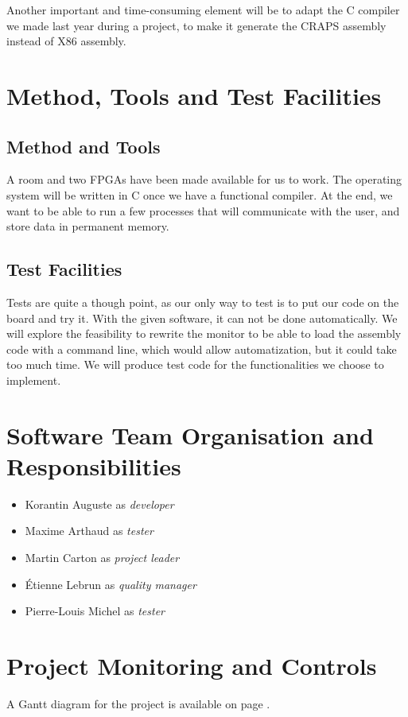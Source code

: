 \documentclass{article}
\begin{document}
    Another important and time-consuming element will be to adapt the C compiler
    we made last year during a project, to make it generate the CRAPS assembly instead
    of X86 assembly.

  \section{Method, Tools and Test Facilities}
    \subsection{Method and Tools}
    A room and two FPGAs have been made available for us to work.
    The operating system will be written in C once we have a functional
    compiler.
    At the end, we want to be able to run a few processes that will communicate
    with the user, and store data in permanent memory.

     \subsection{Test Facilities}
    Tests are quite a though point, as our only way to test is to put
    our code on the board and try it. With the given software, it can not be
    done automatically.
    We will explore the feasibility to rewrite the monitor to be able to load
    the assembly code with a command line, which would allow automatization, but
    it could take too much time.
    We will produce test code for the functionalities we choose to implement.

  \section{Software Team Organisation and Responsibilities}
    \begin{itemize}
      \item Korantin Auguste as \textit{developer}
      \item Maxime Arthaud as \textit{tester}
      \item Martin Carton as \textit{project leader}
      \item Étienne Lebrun as \textit{quality manager}
      \item Pierre-Louis Michel as \textit{tester}
    \end{itemize}

  \section{Project Monitoring and Controls}
    A Gantt diagram for the project is available on page \pageref{fig:gantt}.
\end{document}

